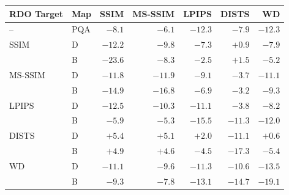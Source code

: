 \begin{tabular}{llrrrrr}
\toprule
RDO Target & Map & SSIM & MS-SSIM & LPIPS & DISTS & WD \\
\midrule
--      & PQA & $-8.1$ & $-6.1$ & $-12.3$ & $-7.9$ & $-12.3$ \\
\midrule
\rowcolor{metband}SSIM & D & $-12.2$ & $-9.8$ & $-7.3$ & $+0.9$ & $-7.9$ \\
\rowcolor{metband} & B & $\mathbf{-23.6}$ & $-8.3$ & $-2.5$ & $+1.5$ & $-5.2$ \\
MS-SSIM & D & $-11.8$ & $-11.9$ & $-9.1$ & $-3.7$ & $-11.1$ \\
 & B & $-14.9$ & $\mathbf{-16.8}$ & $-6.9$ & $-3.2$ & $-9.3$ \\
\rowcolor{metband}LPIPS & D & $-12.5$ & $-10.3$ & $-11.1$ & $-3.8$ & $-8.2$ \\
\rowcolor{metband} & B & $-5.9$ & $-5.3$ & $\mathbf{-15.5}$ & $-11.3$ & $-12.0$ \\
DISTS & D & $+5.4$ & $+5.1$ & $+2.0$ & $-11.1$ & $+0.6$ \\
 & B & $+4.9$ & $+4.6$ & $-4.5$ & $\mathbf{-17.3}$ & $-5.4$ \\
\rowcolor{metband}WD & D & $-11.1$ & $-9.6$ & $-11.3$ & $-10.6$ & $-13.5$ \\
\rowcolor{metband} & B & $-9.3$ & $-7.8$ & $-13.1$ & $-14.7$ & $\mathbf{-19.1}$ \\
\bottomrule
\end{tabular}
